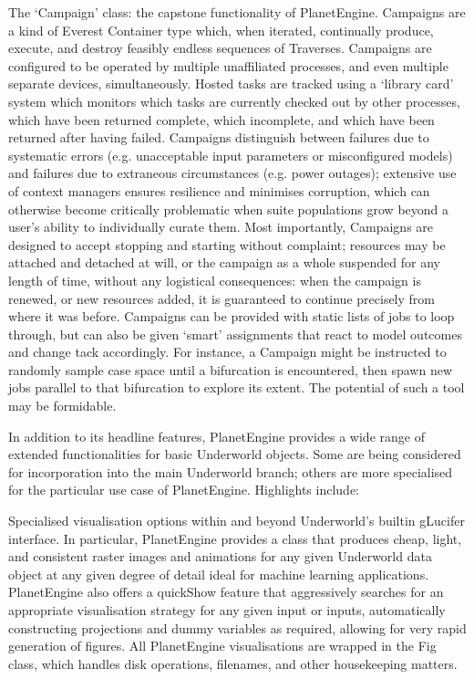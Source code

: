 \documentclass[letterpaper,10pt,english]{jupyterBook}
\begin{document}
\sphinxAtStartPar
The ‘Campaign’ class: the capstone functionality of PlanetEngine. Campaigns are a kind of Everest Container type which, when iterated, continually produce, execute, and destroy feasibly endless sequences of Traverses. Campaigns are configured to be operated by multiple unaffiliated processes, and even multiple separate devices, simultaneously. Hosted tasks are tracked using a ‘library card’ system which monitors which tasks are currently checked out by other processes, which have been returned complete, which incomplete, and which have been returned after having failed. Campaigns distinguish between failures due to systematic errors (e.g. unacceptable input parameters or misconfigured models) and failures due to extraneous circumstances (e.g. power outages); extensive use of context managers ensures resilience and minimises corruption, which can otherwise become critically problematic when suite populations grow beyond a user’s ability to individually curate them. Most importantly, Campaigns are designed to accept stopping and starting without complaint; resources may be attached and detached at will, or the campaign as a whole suspended for any length of time, without any logistical consequences: when the campaign is renewed, or new resources added, it is guaranteed to continue precisely from where it was before. Campaigns can be provided with static lists of jobs to loop through, but can also be given ‘smart’ assignments that react to model outcomes and change tack accordingly. For instance, a Campaign might be instructed to randomly sample case space until a bifurcation is encountered, then spawn new jobs parallel to that bifurcation to explore its extent. The potential of such a tool may be formidable.

\sphinxAtStartPar
In addition to its headline features, PlanetEngine provides a wide range of extended functionalities for basic Underworld objects. Some are being considered for incorporation into the main Underworld branch; others are more specialised for the particular use case of PlanetEngine. Highlights include:

\sphinxAtStartPar
Specialised visualisation options within and beyond Underworld’s built\sphinxhyphen{}in gLucifer interface. In particular, PlanetEngine provides a class that produces cheap, light, and consistent raster images and animations for any given Underworld data object at any given degree of detail \sphinxhyphen{} ideal for machine learning applications. PlanetEngine also offers a quickShow feature that aggressively searches for an appropriate visualisation strategy for any given input or inputs, automatically constructing projections and dummy variables as required, allowing for very rapid generation of figures. All PlanetEngine visualisations are wrapped in the Fig class, which handles disk operations, filenames, and other house\sphinxhyphen{}keeping matters.
\end{document}
